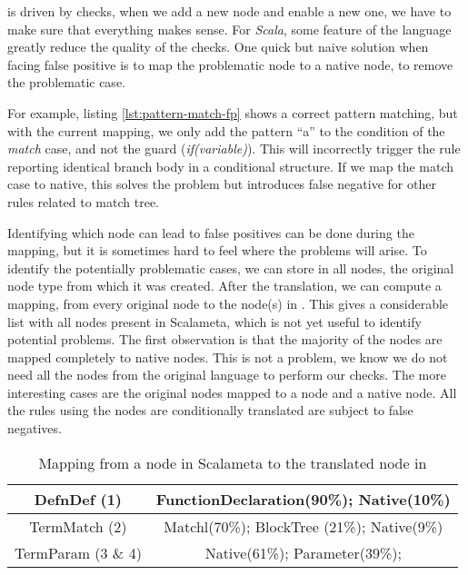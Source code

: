 \slang{} is driven by checks, when we add a new node and enable a new one, we have to make sure that everything makes sense. 
For \emph{Scala}, some feature of the language greatly reduce the quality of the checks.
One quick but naive solution when facing false positive is to map the problematic node to a native node, to remove the problematic case.



For example, listing \ref{lst:pattern-match-fp} shows a correct pattern matching, but with the current mapping, we only add the pattern ``a'' to the condition of the \emph{match} case, and not the guard (\emph{if(variable)}). 
This will incorrectly trigger the rule reporting identical branch body in a conditional structure. 
If we map the match case to native, this solves the problem but introduces false negative for other rules related to match tree.

Identifying which node can lead to false positives can be done during the mapping, but it is sometimes hard to feel where the problems will arise. 
To identify the potentially problematic cases, we can store in all nodes, the original node type from which it was created. 
After the translation, we can compute a mapping, from every original node to the node(s) in \slang{}. 
This gives a considerable list with all nodes present in Scalameta, which is not yet useful to identify potential problems. 
The first observation is that the majority of the nodes are mapped completely to native nodes. 
This is not a problem, we know we do not need all the nodes from the original language to perform our checks.
The more interesting cases are the original nodes mapped to a \slang{} node and a native node. 
All the rules using the nodes are conditionally translated are subject to false negatives.

\begin{table}[h]
	\centering
	\caption{Mapping from a node in Scalameta to the translated node in \slang{}}
	\label{table:interesting_mapping}
	\begin{tabular}{|c|c|}
		\hline
		DefnDef (1) &  FunctionDeclaration(90\%); Native(10\%) \\ \hline
		TermMatch (2) &  Matchl(70\%); BlockTree (21\%); Native(9\%) \\ \hline
		TermParam (3 \& 4) & Native(61\%); Parameter(39\%); \\ \hline
	\end{tabular}
\end{table}

